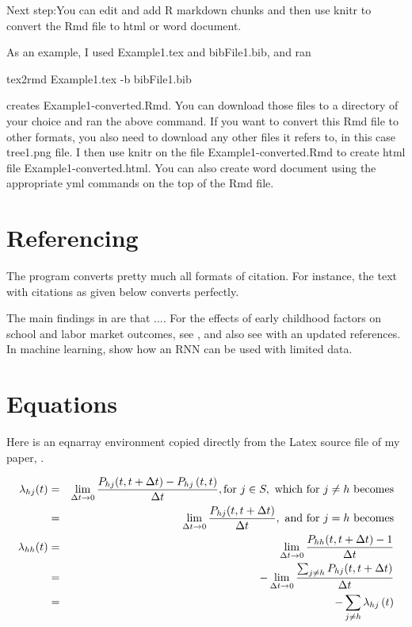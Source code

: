 \documentclass[12pt,svgnames]{article}
\begin{document}
Next step:You can edit and add R markdown chunks and then use knitr to convert the Rmd file to html or word document.  

As an example, I used Example1.tex and bibFile1.bib, and ran  

tex2rmd Example1.tex -b bibFile1.bib  

creates Example1-converted.Rmd. You can download those files to a directory of your choice and ran the above command.  If you want to convert this Rmd file to other formats, you also need to download any other files it refers to, in this case tree1.png file. I then use knitr on the file Example1-converted.Rmd to create html file Example1-converted.html. You can also create word document using the appropriate yml commands on the top of the Rmd file. 

\section {Referencing}\label{sec3}
The program converts pretty much all formats of citation.  For instance, the text with citations as given below converts perfectly.

The main findings in \citep{Aalen.etal_2008_Book,Kanherkar.etal_2014} are that .... For the effects of early childhood factors on school and labor market outcomes, see \cite{Heckman.Raut_2016}, and also see \cite{Raut_2018} with an updated references. In machine learning, \cite{Altae-Tran_2016,Altae-Tran.etal_2017} show how an RNN can be used with limited data. 

\section{Equations}\label{sec4}

Here is an eqnarray environment copied directly from the Latex source file of my paper, \cite{Raut_2019}. 

\begin{eqnarray}
\lambda _{hj}(t) &=&\lim_{\Delta t\rightarrow 0}\frac{P_{hj}(t,t+\Delta
t)-P_{hj}\left( t,t\right) }{\Delta t},\text{for }j\in S,\text{ which for }%
j\neq h\text{ becomes}  \notag \\
&=&\lim_{\Delta t\rightarrow 0}\frac{P_{hj}(t,t+\Delta t)}{\Delta t},\text{
and for }j=h\text{ becomes}  \notag \\
\lambda _{hh}(t) &=&\lim_{\Delta t\rightarrow 0}\frac{P_{hh}(t,t+\Delta t)-1%
}{\Delta t}  \label{eq3} \\
&=&-\lim_{\Delta t\rightarrow 0}\frac{\sum_{j\neq h}P_{hj}(t,t+\Delta t)}{%
\Delta t}  \notag \\
&=&-\sum_{j\neq h}\lambda _{hj}\left( t\right)   \notag
\end{eqnarray}%
\end{document}
